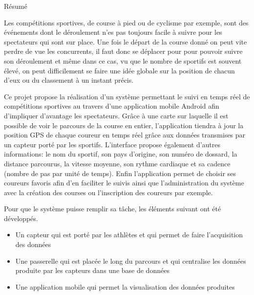 %
%







\pagestyle{fancy}

\LARGE{Résumé}

\begin{normalsize}
Les compétitions sportives, de course à pied ou de cyclisme par exemple, sont des événements dont le déroulement n'es pas toujours facile à suivre pour les spectateurs qui sont sur place. Une fois le départ de la course donné on peut vite perdre de vue les concurrents, il faut donc se déplacer pour pour pouvoir suivre son déroulement et même dans ce cas, vu que le nombre de sportifs est souvent élevé, on peut difficilement se faire une idée globale sur la position de chacun d'eux ou du classement à un instant précis. 

Ce projet propose la réalisation d’un système permettant le suivi en temps réel de compétitions sportives au travers d’une application mobile Android afin d'impliquer d'avantage les spectateurs. Grâce à une carte sur laquelle il est possible de voir le parcours de la course en entier, l'application tiendra à jour la position GPS de chaque coureur en temps réel grâce aux données transmises par un capteur porté par les sportifs. L'interface propose également d'autres informations: le nom du sportif, son pays d'origine, son numéro de dossard, la distance parcourus, la vitesse moyenne, son rythme cardiaque et sa cadence (nombre de pas par unité de temps). Enfin l'application permet de choisir ses coureurs favoris afin d'en faciliter le suivis ainsi que l'administration du système avec la création des courses ou l'inscription des coureurs par exemple.

Pour que le système puisse remplir sa tâche, les éléments suivant ont été développés.

\begin{itemize}
\item Un capteur qui est porté par les athlètes et qui permet de faire l'acquisition des données
\item Une passerelle qui est placée le long du parcours et qui centralise les données produite par les capteurs dans une base de données
\item Une application mobile qui permet la visualisation des données produites
\end{itemize}


\end{normalsize}
